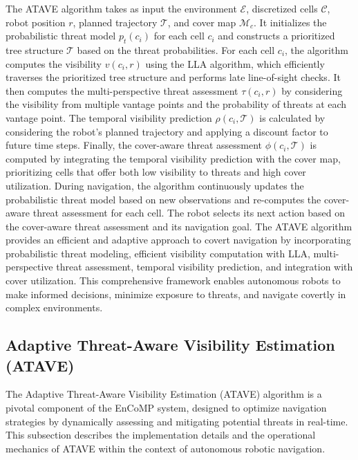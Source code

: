 The ATAVE algorithm takes as input the environment $\mathcal{E}$, discretized cells $\mathcal{C}$, robot position $r$, planned trajectory $\mathcal{T}$, and cover map $\mathcal{M}_c$. It initializes the probabilistic threat model $p_t(c_i)$ for each cell $c_i$ and constructs a prioritized tree structure $\mathcal{T}$ based on the threat probabilities.
For each cell $c_i$, the algorithm computes the visibility $v(c_i, r)$ using the LLA algorithm, which efficiently traverses the prioritized tree structure and performs late line-of-sight checks. It then computes the multi-perspective threat assessment $\tau(c_i, r)$ by considering the visibility from multiple vantage points and the probability of threats at each vantage point.
The temporal visibility prediction $\rho(c_i, \mathcal{T})$ is calculated by considering the robot's planned trajectory and applying a discount factor to future time steps. Finally, the cover-aware threat assessment $\phi(c_i, \mathcal{T})$ is computed by integrating the temporal visibility prediction with the cover map, prioritizing cells that offer both low visibility to threats and high cover utilization.
During navigation, the algorithm continuously updates the probabilistic threat model based on new observations and re-computes the cover-aware threat assessment for each cell. The robot selects its next action based on the cover-aware threat assessment and its navigation goal.
The ATAVE algorithm provides an efficient and adaptive approach to covert navigation by incorporating probabilistic threat modeling, efficient visibility computation with LLA, multi-perspective threat assessment, temporal visibility prediction, and integration with cover utilization. This comprehensive framework enables autonomous robots to make informed decisions, minimize exposure to threats, and navigate covertly in complex environments.


\subsection{Adaptive Threat-Aware Visibility Estimation (ATAVE)}
\label{subsec:atave}

The Adaptive Threat-Aware Visibility Estimation (ATAVE) algorithm is a pivotal component of the EnCoMP system, designed to optimize navigation strategies by dynamically assessing and mitigating potential threats in real-time. This subsection describes the implementation details and the operational mechanics of ATAVE within the context of autonomous robotic navigation.

